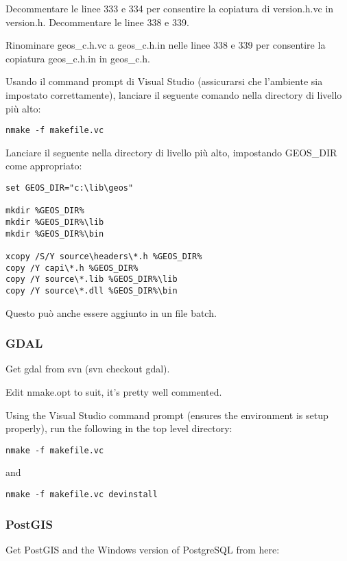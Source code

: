 Decommentare le linee 333 e 334 per consentire la copiatura di version.h.vc in version.h.
Decommentare le linee 338 e 339.

Rinominare geos\_c.h.vc a geos\_c.h.in nelle linee 338 e 339 per consentire la copiatura geos\_c.h.in in geos\_c.h.

Usando il command prompt di Visual Studio (assicurarsi che l'ambiente sia impostato correttamente), lanciare il seguente comando nella directory di livello più alto:

\begin{verbatim}
nmake -f makefile.vc 
\end{verbatim}

Lanciare il seguente nella directory di livello più alto, impostando GEOS\_DIR come appropriato:

\begin{verbatim}
set GEOS_DIR="c:\lib\geos"

mkdir %GEOS_DIR%
mkdir %GEOS_DIR%\lib
mkdir %GEOS_DIR%\bin

xcopy /S/Y source\headers\*.h %GEOS_DIR%
copy /Y capi\*.h %GEOS_DIR%
copy /Y source\*.lib %GEOS_DIR%\lib
copy /Y source\*.dll %GEOS_DIR%\bin
\end{verbatim}

Questo può anche essere aggiunto in un file batch.

\subsubsection{GDAL}
Get gdal from svn (svn checkout  gdal).

Edit nmake.opt to suit, it's pretty well commented.

Using the Visual Studio command prompt (ensures the environment is setup properly), run the following in the top level directory:

\begin{verbatim}
nmake -f makefile.vc 
\end{verbatim}

and

\begin{verbatim}
nmake -f makefile.vc devinstall 
\end{verbatim}

\subsubsection{PostGIS}
Get PostGIS and the Windows version of PostgreSQL from here:

